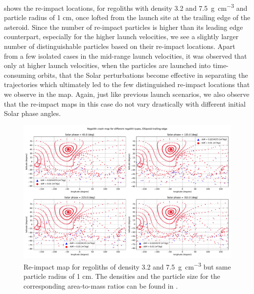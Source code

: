  shows the re-impact locations, for regoliths with density 3.2 and \SI{7.5}{\gram\per\centi\metre\cubed} and particle radius of 1 cm, once lofted from the launch site at the trailing edge of the asteroid. Since the number of re-impact particles is higher than its leading edge counterpart, especially for the higher launch velocities, we see a slightly larger number of distinguishable particles based on their re-impact locations. Apart from a few isolated cases in the mid-range launch velocities, it was observed that only at higher launch velocities, when the particles are launched into time-consuming orbits, that the Solar perturbations become effective in separating the trajectories which ultimately led to the few distinguished re-impact locations that we observe in the map. Again, just like previous launch scenarios, we also observe that the re-impact maps in this case do not vary drastically with different initial Solar phase angles.
\begin{figure}[htb]
\centering
\captionsetup{justification=centering}
\includegraphics[angle=90, width=\textwidth, height=\textheight, keepaspectratio=true]{trailing_edge_perturbations/crashMap_3P2_7P5_density_1cm_radius.pdf}
\caption{Re-impact map for regoliths of density 3.2 and \SI{7.5}{\gram\per\centi\metre\cubed} but same particle radius of 1 cm. The densities and the particle size for the corresponding area-to-mass ratios can be found in .}
\label{fig:trailingEdge_crashmap_3P2_7P5_density_1cm_radius}
\end{figure}
\FloatBarrier
